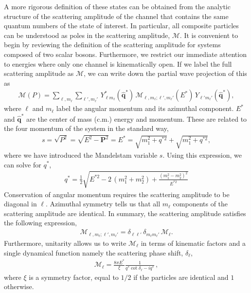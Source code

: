\documentclass{iopart}
\theoremstyle{definition}
\begin{document}
{A more rigorous definition of these states can be obtained from the analytic structure of the scattering amplitude of the channel that contains the same quantum numbers of the state of interest. In particular, all composite particles can be understood as poles in the scattering amplitude, $\mathcal{M}$. It is convenient to begin by reviewing the definition of the scattering amplitude for systems composed of two scalar bosons. Furthermore, we restrict our immediate attention to energies where only one channel is kinematically open. If we label the full scattering amplitude as $\mathcal{M}$, we can write down the partial wave projection of this as 
\begin{eqnarray}
\mathcal{M}(P)=\sum_{\ell,m_\ell}\sum_{\ell',m_\ell'}\,
Y^*_{\ell m_\ell}(\hat {\mathbf q}^*) \,
\mathcal{M}_{\ell,m_\ell;\ell',m_\ell'}(E^*)\,
Y_{\ell' m_\ell'}(\hat  {\mathbf q}^*),
\end{eqnarray}
where $\ell$ and $m_\ell$ label the angular momentum and its azimuthal component. $E^*$ and $\hat {\mathbf q}^*$ are the center of mass (c.m.) energy and momentum. These are related to the four momentum of the system in the standard way, 
\begin{eqnarray}
s=\sqrt{P^2}=\sqrt{E^2-\mathbf{P}^2}=E^{*}=\sqrt{m_1^2+{ q}^{*2}}+\sqrt{m_1^2+{ q}^{*2}},
\end{eqnarray}
where we have introduced the Mandelstam variable $s$. Using this expression, we can solve for $q^*$,
\begin{eqnarray}
q^*=\frac{1}{2}\sqrt{E^{*2}-2\,(m_1^2+m_2^2)+\frac{(m_1^2-m_2^2)^2}{E^{*2}}}
\end{eqnarray}
Conservation of angular momentum requires the scattering amplitude to be diagonal in $\ell$. Azimuthal symmetry tells us that all $m_\ell$ components of the scattering amplitude are identical. In summary, the scattering amplitude satisfies the following expression,
\begin{eqnarray}
\mathcal{M}_{\ell,m_\ell;\ell',m_\ell'}
=\delta_{\ell\ell'}\,\delta_{m_\ell m_\ell'}\,\mathcal M_{\ell}.
\end{eqnarray}
Furthermore, unitarity allows us to write $\mathcal M_{\ell}$ in terms of kinematic factors and a single dynamical function namely the scattering phase shift, $\delta_{\ell}$,~\cite{Kim:2005gf}
\begin{eqnarray}
\mathcal M_{\ell}=\frac{8\pi E^*}{\xi}\frac{1}{q^*\cot\delta_{\ell}-iq^*} \,,
\label{eq:scatamp}
\end{eqnarray}
where $\xi$ is a symmetry factor, equal to $1/2$ if the particles are identical and $1$ otherwise. 

}
\end{document}
